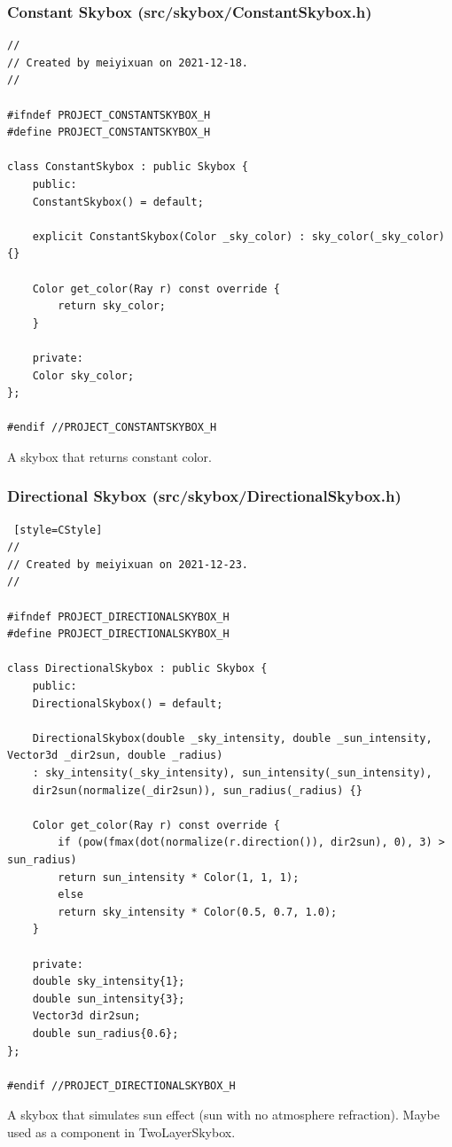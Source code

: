 \documentclass[utf8]{article}
\begin{document}
\subsubsection{Constant Skybox (src/skybox/ConstantSkybox.h)}
\begin{lstlisting}[style=CStyle]
//
// Created by meiyixuan on 2021-12-18.
//

#ifndef PROJECT_CONSTANTSKYBOX_H
#define PROJECT_CONSTANTSKYBOX_H

class ConstantSkybox : public Skybox {
	public:
	ConstantSkybox() = default;
	
	explicit ConstantSkybox(Color _sky_color) : sky_color(_sky_color) {}
	
	Color get_color(Ray r) const override {
		return sky_color;
	}
	
	private:
	Color sky_color;
};

#endif //PROJECT_CONSTANTSKYBOX_H

\end{lstlisting}
A skybox that returns constant color.

\subsubsection{Directional Skybox (src/skybox/DirectionalSkybox.h)}
\begin{lstlisting} [style=CStyle]
//
// Created by meiyixuan on 2021-12-23.
//

#ifndef PROJECT_DIRECTIONALSKYBOX_H
#define PROJECT_DIRECTIONALSKYBOX_H

class DirectionalSkybox : public Skybox {
	public:
	DirectionalSkybox() = default;
	
	DirectionalSkybox(double _sky_intensity, double _sun_intensity, Vector3d _dir2sun, double _radius)
	: sky_intensity(_sky_intensity), sun_intensity(_sun_intensity),
	dir2sun(normalize(_dir2sun)), sun_radius(_radius) {}
	
	Color get_color(Ray r) const override {
		if (pow(fmax(dot(normalize(r.direction()), dir2sun), 0), 3) > sun_radius)
		return sun_intensity * Color(1, 1, 1);
		else
		return sky_intensity * Color(0.5, 0.7, 1.0);
	}
	
	private:
	double sky_intensity{1};
	double sun_intensity{3};
	Vector3d dir2sun;
	double sun_radius{0.6};
};

#endif //PROJECT_DIRECTIONALSKYBOX_H

\end{lstlisting}
A skybox that simulates sun effect (sun with no atmosphere refraction). Maybe used as a component in TwoLayerSkybox.
\end{document}
